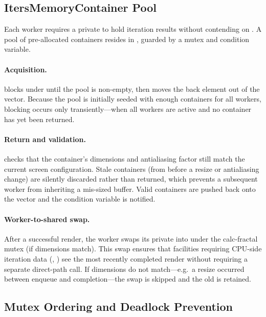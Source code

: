 \subsection{ItersMemoryContainer Pool}
\label{subsec:iters-pool}

Each worker requires a private  to hold
iteration results without contending on .  A pool
of pre-allocated containers resides in
, guarded by a mutex and
condition variable.

\paragraph{Acquisition.}
 blocks under
 until the pool is non-empty, then
moves the back element out of the vector.  Because the pool is
initially seeded with enough containers for all workers, blocking
occurs only transiently---when all workers are active and no
container has yet been returned.

\paragraph{Return and validation.}
 checks that the container's dimensions and
antialiasing factor still match the current screen configuration.
Stale containers (from before a resize or antialiasing change) are
silently discarded rather than returned, which prevents a subsequent
worker from inheriting a mis-sized buffer.  Valid containers are
pushed back onto the vector and the condition variable is notified.

\paragraph{Worker-to-shared swap.}
After a successful render, the worker swaps its private
 into  under the
calc-fractal mutex (if dimensions match).  This swap ensures that
facilities requiring CPU-side iteration data
(, ) see the
most recently completed render without requiring a separate direct-path
call.  If dimensions do not match---e.g.\ a resize occurred between
enqueue and completion---the swap is skipped and the old
 is retained.

\subsection{Mutex Ordering and Deadlock Prevention}
\label{subsec:mutex-ordering}

